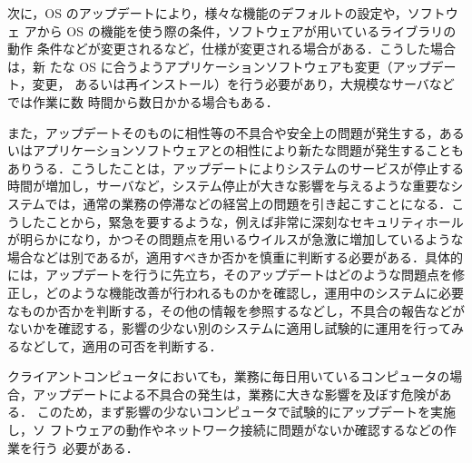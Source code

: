 次に，OS のアップデートにより，様々な機能のデフォルトの設定や，ソフトウェ
アから OS の機能を使う際の条件，ソフトウェアが用いているライブラリの動作
条件などが変更されるなど，仕様が変更される場合がある．こうした場合は，新
たな OS に合うようアプリケーションソフトウェアも変更（アップデート，変更，
あるいは再インストール）を行う必要があり，大規模なサーバなどでは作業に数
時間から数日かかる場合もある．

また，アップデートそのものに相性等の不具合や安全上の問題が発生する，ある
いはアプリケーションソフトウェアとの相性により新たな問題が発生することも
ありうる．こうしたことは，アップデートによりシステムのサービスが停止する
時間が増加し，サーバなど，システム停止が大きな影響を与えるような重要なシ
ステムでは，通常の業務の停滞などの経営上の問題を引き起こすことになる．こ
うしたことから，緊急を要するような，例えば非常に深刻なセキュリティホール
が明らかになり，かつその問題点を用いるウイルスが急激に増加しているような
場合などは別であるが，適用すべきか否かを慎重に判断する必要がある．具体的
には，アップデートを行うに先立ち，そのアップデートはどのような問題点を修
正し，どのような機能改善が行われるものかを確認し，運用中のシステムに必要
なものか否かを判断する，その他の情報を参照するなどし，不具合の報告などが
ないかを確認する，影響の少ない別のシステムに適用し試験的に運用を行ってみ
るなどして，適用の可否を判断する．

クライアントコンピュータにおいても，業務に毎日用いているコンピュータの場
合，アップデートによる不具合の発生は，業務に大きな影響を及ぼす危険がある．
このため，まず影響の少ないコンピュータで試験的にアップデートを実施し，ソ
フトウェアの動作やネットワーク接続に問題がないか確認するなどの作業を行う
必要がある．

